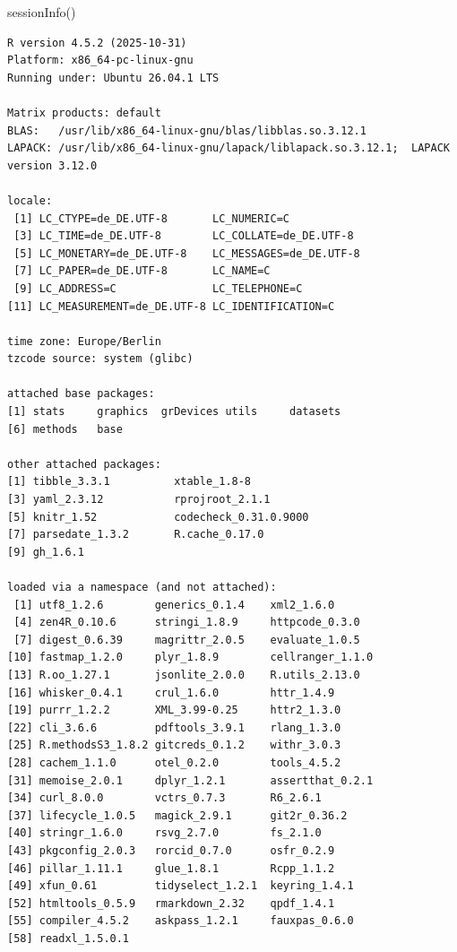 \documentclass[
  letterpaper,
  DIV=11,
  numbers=noendperiod]{scrartcl}
\newenvironment{Shaded}{\begin{snugshade}}{\end{snugshade}}
\newcommand{\FunctionTok}[1]{\textcolor[rgb]{0.28,0.35,0.67}{#1}}
\newcommand{\NormalTok}[1]{\textcolor[rgb]{0.00,0.23,0.31}{#1}}
\begin{document}
\begin{Shaded}
\begin{Highlighting}[]
\FunctionTok{sessionInfo}\NormalTok{()}
\end{Highlighting}
\end{Shaded}

\begin{verbatim}
R version 4.5.2 (2025-10-31)
Platform: x86_64-pc-linux-gnu
Running under: Ubuntu 26.04.1 LTS

Matrix products: default
BLAS:   /usr/lib/x86_64-linux-gnu/blas/libblas.so.3.12.1 
LAPACK: /usr/lib/x86_64-linux-gnu/lapack/liblapack.so.3.12.1;  LAPACK version 3.12.0

locale:
 [1] LC_CTYPE=de_DE.UTF-8       LC_NUMERIC=C              
 [3] LC_TIME=de_DE.UTF-8        LC_COLLATE=de_DE.UTF-8    
 [5] LC_MONETARY=de_DE.UTF-8    LC_MESSAGES=de_DE.UTF-8   
 [7] LC_PAPER=de_DE.UTF-8       LC_NAME=C                 
 [9] LC_ADDRESS=C               LC_TELEPHONE=C            
[11] LC_MEASUREMENT=de_DE.UTF-8 LC_IDENTIFICATION=C       

time zone: Europe/Berlin
tzcode source: system (glibc)

attached base packages:
[1] stats     graphics  grDevices utils     datasets 
[6] methods   base     

other attached packages:
[1] tibble_3.3.1          xtable_1.8-8         
[3] yaml_2.3.12           rprojroot_2.1.1      
[5] knitr_1.52            codecheck_0.31.0.9000
[7] parsedate_1.3.2       R.cache_0.17.0       
[9] gh_1.6.1             

loaded via a namespace (and not attached):
 [1] utf8_1.2.6        generics_0.1.4    xml2_1.6.0       
 [4] zen4R_0.10.6      stringi_1.8.9     httpcode_0.3.0   
 [7] digest_0.6.39     magrittr_2.0.5    evaluate_1.0.5   
[10] fastmap_1.2.0     plyr_1.8.9        cellranger_1.1.0 
[13] R.oo_1.27.1       jsonlite_2.0.0    R.utils_2.13.0   
[16] whisker_0.4.1     crul_1.6.0        httr_1.4.9       
[19] purrr_1.2.2       XML_3.99-0.25     httr2_1.3.0      
[22] cli_3.6.6         pdftools_3.9.1    rlang_1.3.0      
[25] R.methodsS3_1.8.2 gitcreds_0.1.2    withr_3.0.3      
[28] cachem_1.1.0      otel_0.2.0        tools_4.5.2      
[31] memoise_2.0.1     dplyr_1.2.1       assertthat_0.2.1 
[34] curl_8.0.0        vctrs_0.7.3       R6_2.6.1         
[37] lifecycle_1.0.5   magick_2.9.1      git2r_0.36.2     
[40] stringr_1.6.0     rsvg_2.7.0        fs_2.1.0         
[43] pkgconfig_2.0.3   rorcid_0.7.0      osfr_0.2.9       
[46] pillar_1.11.1     glue_1.8.1        Rcpp_1.1.2       
[49] xfun_0.61         tidyselect_1.2.1  keyring_1.4.1    
[52] htmltools_0.5.9   rmarkdown_2.32    qpdf_1.4.1       
[55] compiler_4.5.2    askpass_1.2.1     fauxpas_0.6.0    
[58] readxl_1.5.0.1   
\end{verbatim}
\end{document}
